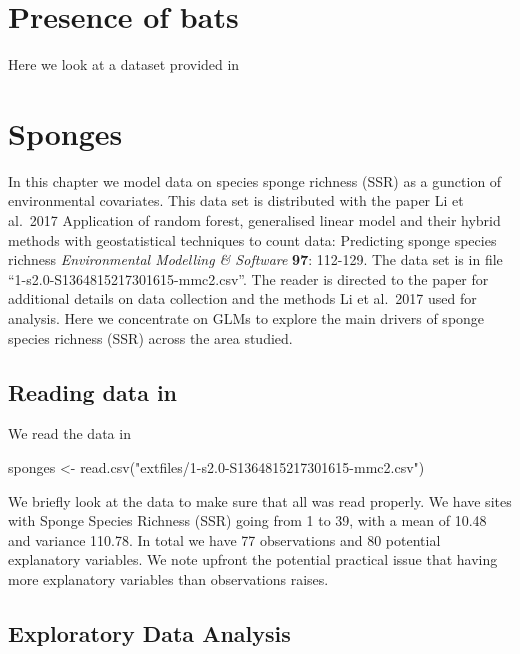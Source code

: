 \documentclass[
]{book}
\newenvironment{Shaded}{\begin{snugshade}}{\end{snugshade}}
\newcommand{\FunctionTok}[1]{\textcolor[rgb]{0.00,0.00,0.00}{#1}}
\newcommand{\NormalTok}[1]{#1}
\newcommand{\OtherTok}[1]{\textcolor[rgb]{0.56,0.35,0.01}{#1}}
\newcommand{\StringTok}[1]{\textcolor[rgb]{0.31,0.60,0.02}{#1}}
\begin{document}
\hypertarget{presence-of-bats}{%
\section{Presence of bats}\label{presence-of-bats}}

Here we look at a dataset provided in

\hypertarget{sponges}{%
\section{Sponges}\label{sponges}}

In this chapter we model data on species sponge richness (SSR) as a gunction of environmental covariates. This data set is distributed with the paper Li et al.~2017 Application of random forest, generalised linear model and their hybrid methods with geostatistical techniques to count data: Predicting sponge species richness \emph{Environmental Modelling \& Software} \textbf{97}: 112-129. The data set is in file ``1-s2.0-S1364815217301615-mmc2.csv''. The reader is directed to the paper for additional details on data collection and the methods Li et al.~2017 used for analysis. Here we concentrate on GLMs to explore the main drivers of sponge species richness (SSR) across the area studied.

\hypertarget{reading-data-in}{%
\subsection{Reading data in}\label{reading-data-in}}

We read the data in

\begin{Shaded}
\begin{Highlighting}[]
\NormalTok{sponges }\OtherTok{\textless{}{-}} \FunctionTok{read.csv}\NormalTok{(}\StringTok{"extfiles/1{-}s2.0{-}S1364815217301615{-}mmc2.csv"}\NormalTok{)}
\end{Highlighting}
\end{Shaded}

We briefly look at the data to make sure that all was read properly. We have sites with Sponge Species Richness (SSR) going from 1 to 39, with a mean of 10.48 and variance 110.78. In total we have 77 observations and 80 potential explanatory variables. We note upfront the potential practical issue that having more explanatory variables than observations raises.

\hypertarget{exploratory-data-analysis}{%
\subsection{Exploratory Data Analysis}\label{exploratory-data-analysis}}
\end{document}
